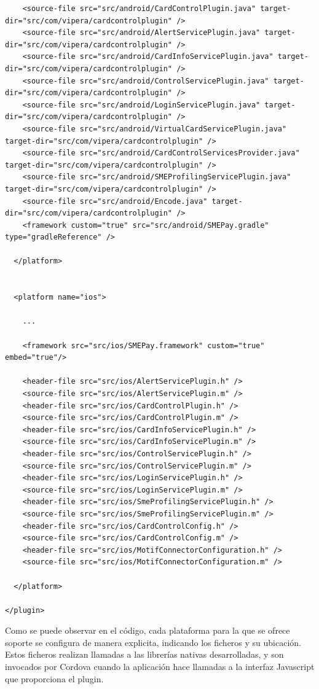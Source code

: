 \documentclass[a4paper, 12pt]{article}
\newenvironment{code}{\captionsetup{type=listing}}{}
\begin{document}
\begin{code}
\begin{verbatim}
    <source-file src="src/android/CardControlPlugin.java" target-dir="src/com/vipera/cardcontrolplugin" />
    <source-file src="src/android/AlertServicePlugin.java" target-dir="src/com/vipera/cardcontrolplugin" />
    <source-file src="src/android/CardInfoServicePlugin.java" target-dir="src/com/vipera/cardcontrolplugin" />
    <source-file src="src/android/ControlServicePlugin.java" target-dir="src/com/vipera/cardcontrolplugin" />
    <source-file src="src/android/LoginServicePlugin.java" target-dir="src/com/vipera/cardcontrolplugin" />
    <source-file src="src/android/VirtualCardServicePlugin.java" target-dir="src/com/vipera/cardcontrolplugin" />
    <source-file src="src/android/CardControlServicesProvider.java" target-dir="src/com/vipera/cardcontrolplugin" />
    <source-file src="src/android/SMEProfilingServicePlugin.java" target-dir="src/com/vipera/cardcontrolplugin" />
    <source-file src="src/android/Encode.java" target-dir="src/com/vipera/cardcontrolplugin" />
    <framework custom="true" src="src/android/SMEPay.gradle" type="gradleReference" />

  </platform>


  <platform name="ios">

    ...

    <framework src="src/ios/SMEPay.framework" custom="true" embed="true"/>

    <header-file src="src/ios/AlertServicePlugin.h" />
    <source-file src="src/ios/AlertServicePlugin.m" />
    <header-file src="src/ios/CardControlPlugin.h" />
    <source-file src="src/ios/CardControlPlugin.m" />
    <header-file src="src/ios/CardInfoServicePlugin.h" />
    <source-file src="src/ios/CardInfoServicePlugin.m" />
    <header-file src="src/ios/ControlServicePlugin.h" />
    <source-file src="src/ios/ControlServicePlugin.m" />
    <header-file src="src/ios/LoginServicePlugin.h" />
    <source-file src="src/ios/LoginServicePlugin.m" />
    <header-file src="src/ios/SmeProfilingServicePlugin.h" />
    <source-file src="src/ios/SmeProfilingServicePlugin.m" />
    <header-file src="src/ios/CardControlConfig.h" />
    <source-file src="src/ios/CardControlConfig.m" />
    <header-file src="src/ios/MotifConnectorConfiguration.h" />
    <source-file src="src/ios/MotifConnectorConfiguration.m" />

  </platform>

</plugin>
\end{verbatim}
\end{code}
\bigbreak
Como se puede observar en el código, cada plataforma para la que se ofrece soporte se configura de manera explicita, indicando los ficheros y su ubicación. Estos ficheros realizan llamadas a las librerías
nativas desarrolladas, y son invocados por Cordova cuando la aplicación hace llamadas a la interfaz Javascript que proporciona el plugin.
\end{document}
